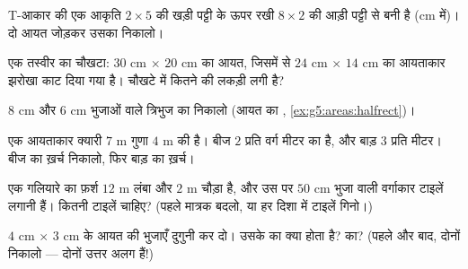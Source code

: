 \begin{exercise}[$\star$]\label{exo:g5:areas:6}
T-आकार की एक आकृति $2 \times 5$ की खड़ी पट्टी के ऊपर रखी
$8 \times 2$ की आड़ी पट्टी से बनी है (cm में)। दो आयत जोड़कर
उसका  निकालो।
\end{exercise}

\begin{exercise}[$\star$]\label{exo:g5:areas:7}
एक तस्वीर का चौखटा: $30$ cm $\times$ $20$ cm का आयत, जिसमें से
$24$ cm $\times$ $14$ cm का आयताकार झरोखा काट दिया गया है।
चौखटे में कितने  की लकड़ी लगी है?
\end{exercise}

\begin{exercise}[$\star$]\label{exo:g5:areas:8}
$8$ cm और $6$ cm भुजाओं वाले  त्रिभुज का  निकालो
(आयत का , \cref{ex:g5:areas:halfrect})।
\end{exercise}

\begin{exercise}[$\star$]\label{exo:g5:areas:9}
एक आयताकार क्यारी $7$ m गुणा $4$ m की है। बीज $2$ प्रति वर्ग
मीटर का है, और बाड़ $3$ प्रति मीटर। बीज का ख़र्च निकालो, फिर बाड़
का ख़र्च।
\end{exercise}

\begin{exercise}[$\star\star$]\label{exo:g5:areas:10}
एक गलियारे का फ़र्श $12$ m लंबा और $2$ m चौड़ा है, और उस पर
$50$ cm भुजा वाली वर्गाकार टाइलें लगानी हैं। कितनी टाइलें
चाहिए? (पहले मात्रक बदलो, या हर दिशा में टाइलें गिनो।)
\end{exercise}

\begin{exercise}[$\star\star$]\label{exo:g5:areas:11}
$4$ cm $\times$ $3$ cm के आयत की भुजाएँ दुगुनी कर दो। उसके
 का क्या होता है?  का? (पहले और बाद, दोनों
निकालो --- दोनों उत्तर अलग हैं!)
\end{exercise}
